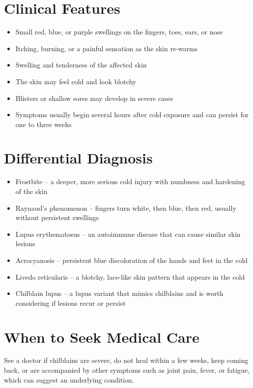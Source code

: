\section*{Clinical Features}
\begin{itemize}
    \item Small red, blue, or purple swellings on the fingers, toes, ears, or nose
    \item Itching, burning, or a painful sensation as the skin re-warms
    \item Swelling and tenderness of the affected skin
    \item The skin may feel cold and look blotchy
    \item Blisters or shallow sores may develop in severe cases
    \item Symptoms usually begin several hours after cold exposure and can persist for one to three weeks
\end{itemize}

\section*{Differential Diagnosis}
\begin{itemize}
    \item Frostbite -- a deeper, more serious cold injury with numbness and hardening of the skin
    \item Raynaud's phenomenon -- fingers turn white, then blue, then red, usually without persistent swellings
    \item Lupus erythematosus -- an autoimmune disease that can cause similar skin lesions
    \item Acrocyanosis -- persistent blue discoloration of the hands and feet in the cold
    \item Livedo reticularis -- a blotchy, lace-like skin pattern that appears in the cold
    \item Chilblain lupus -- a lupus variant that mimics chilblains and is worth considering if lesions recur or persist
\end{itemize}

\section*{When to Seek Medical Care}
See a doctor if chilblains are severe, do not heal within a few weeks, keep coming back, or are accompanied by other symptoms such as joint pain, fever, or fatigue, which can suggest an underlying condition.

